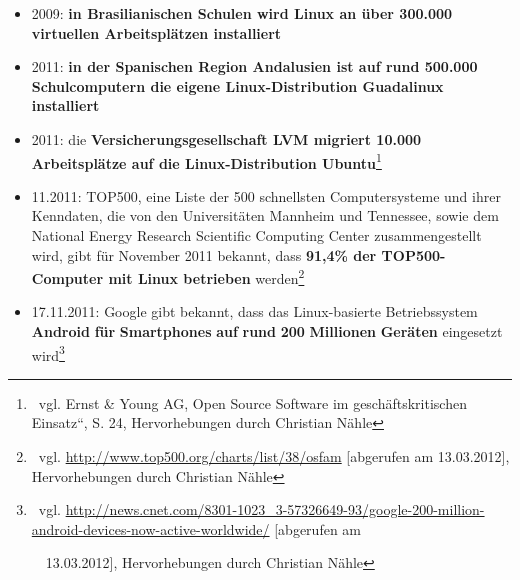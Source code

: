 \documentclass[a4paper]{article}
\newcommand\liststyleWWviiiNumiii{%
\renewcommand\theenumi{\arabic{enumi}}
\renewcommand\theenumii{\arabic{enumii}}
\renewcommand\theenumiii{\arabic{enumiii}}
\renewcommand\labelitemi{{}-}
\renewcommand\labelenumi{\theenumi.}
\renewcommand\labelenumii{\theenumii.}
\renewcommand\labelenumiii{\theenumiii.}
}
\begin{document}
\bigskip

\liststyleWWviiiNumiii
\begin{itemize}
\item {
2009: \textbf{i}\textbf{n Brasilianischen Schulen wird Linux an \"uber
300.000 virtuellen Arbeitspl\"atzen installiert}}
\end{itemize}

\bigskip

\liststyleWWviiiNumiii
\begin{itemize}
\item {
2011: \textbf{i}\textbf{n der Spanischen Region Andalusien ist auf rund
500.000 Schulcomputern die eigene Linux-Distribution Guadalinux
installiert}}
\end{itemize}

\bigskip

\liststyleWWviiiNumiii
\begin{itemize}
\item {
2011: die \textbf{Versicherungsgesellschaft LVM migriert 10.000
Arbeitspl\"atze auf die Linux-Distribution
Ubuntu}{\guillemotleft}\footnote{\ vgl. Ernst \& Young AG,
{\quotedblbase}Open Source Software im gesch\"aftskritischen
Einsatz{\textquotedblleft}, S. 24, Hervorhebungen durch Christian
N\"ahle}}
\end{itemize}

\bigskip

\liststyleWWviiiNumiii
\begin{itemize}
\item {
11.2011: TOP500, eine Liste der 500 schnellsten Computersysteme und
ihrer Kenndaten, die von den Universit\"aten Mannheim und Tennessee,
sowie dem National Energy Research Scientific Computing Center
zusammengestellt wird, gibt f\"ur November 2011 bekannt, dass
\textbf{91,4\% der TOP500-Computer mit Linux betrieben}
werden\footnote{\ vgl. \url{http://www.top500.org/charts/list/38/osfam}
[abgerufen am 13.03.2012], Hervorhebungen durch Christian N\"ahle}}
\end{itemize}

\bigskip

\liststyleWWviiiNumiii
\begin{itemize}
\item {
17.11.2011: Google gibt bekannt, dass das Linux-basierte Betriebssystem
\textbf{Android}\textbf{ }\textbf{f\"ur}\textbf{
}\textbf{Smartphones}\textbf{ }\textbf{auf}\textbf{
}\textbf{rund}\textbf{ }\textbf{200}\textbf{
}\textbf{Millionen}\textbf{ }\textbf{Ger\"aten} eingesetzt
wird\footnote{\ vgl.
\url{http://news.cnet.com/8301-1023_3-57326649-93/google-200-million-android-devices-now-active-worldwide/}
[abgerufen am\par \ \ 13.03.2012], Hervorhebungen durch Christian
N\"ahle}}
\end{itemize}
\end{document}
